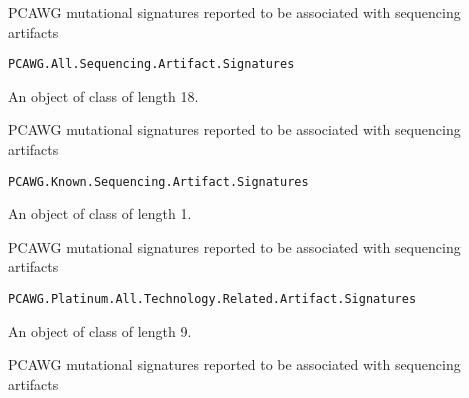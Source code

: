 \documentclass[letterpaper]{book}
\begin{document}
%
\begin{Description}\relax
PCAWG mutational signatures reported to be associated with sequencing artifacts
\end{Description}
%
\begin{Usage}
\begin{verbatim}
PCAWG.All.Sequencing.Artifact.Signatures
\end{verbatim}
\end{Usage}
%
\begin{Format}
An object of class  of length 18.
\end{Format}
%
\begin{Description}\relax
PCAWG mutational signatures reported to be associated with sequencing artifacts
\end{Description}
%
\begin{Usage}
\begin{verbatim}
PCAWG.Known.Sequencing.Artifact.Signatures
\end{verbatim}
\end{Usage}
%
\begin{Format}
An object of class  of length 1.
\end{Format}
%
\begin{Description}\relax
PCAWG mutational signatures reported to be associated with sequencing artifacts
\end{Description}
%
\begin{Usage}
\begin{verbatim}
PCAWG.Platinum.All.Technology.Related.Artifact.Signatures
\end{verbatim}
\end{Usage}
%
\begin{Format}
An object of class  of length 9.
\end{Format}
%
\begin{Description}\relax
PCAWG mutational signatures reported to be associated with sequencing artifacts
\end{Description}
\end{document}

